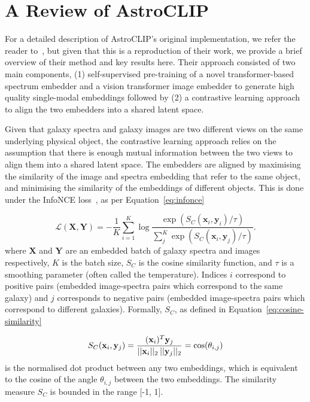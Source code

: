 
\section{A Review of AstroCLIP}\label{sec:original-paper}
For a detailed description of AstroCLIP's original implementation, we refer the reader to~\cite{astroclip}, but given that
this is a reproduction of their work, we provide a brief overview of their method and key results here.
Their approach consisted of two main components, (1) self-supervised pre-training of a novel transformer-based spectrum
embedder and a vision transformer image embedder to generate high quality single-modal embeddings followed by (2) a
contrastive learning approach to align the two embedders into a shared latent space.

Given that galaxy spectra and galaxy images are two different views on the same underlying physical object, the
contrastive learning approach relies on the assumption that there is enough mutual information between the two views
to align them into a shared latent space.
The embedders are aligned by maximising the similarity of the image and spectra embedding that refer to the same object, and
minimising the similarity of the embeddings of different objects.
This is done under the InfoNCE loss~\citep{oord2019}, as per Equation~\eqref{eq:infonce}

\begin{equation}
\label{eq:infonce}
    \mathcal{L}(\mathbf{X}, \mathbf{Y}) = - \frac{1}{K} \sum_{i=1}^K \log \frac{\exp(S_C(\mathbf{x}_i, \mathbf{y}_i) / \tau)}{\sum_{j}^K \exp(S_C(\mathbf{x}_i, \mathbf{y}_j) / \tau)}.
\end{equation}
where $\mathbf{X}$ and $\mathbf{Y}$ are an embedded batch of galaxy spectra and images respectively, $K$ is the batch size,
$S_C$ is the cosine similarity function, and $\tau$ is a smoothing parameter (often called the temperature).
Indices $i$ correspond to positive pairs (embedded image-spectra pairs which correspond to the same galaxy) and $j$ corresponds
to negative pairs (embedded image-spectra pairs which correspond to different galaxies).
Formally, $S_C$, as defined in Equation~\eqref{eq:cosine-similarity}

\begin{equation}
\label{eq:cosine-similarity}
    S_C(\mathbf{x}_i, \mathbf{y}_j) = \frac{(\mathbf{x}_i)^{T} \mathbf{y}_j}{ ||\mathbf{x}_i||_{2} \hspace{0.2em} ||\mathbf{y}_j||_{2}}
    = \cos(\theta_{i,j})
\end{equation}
is the normalised dot product between any two embeddings, which is equivalent to the cosine of the angle $\theta_{i,j}$ between the
two embeddings.
The similarity measure $S_C$ is bounded in the range [-1, 1].

